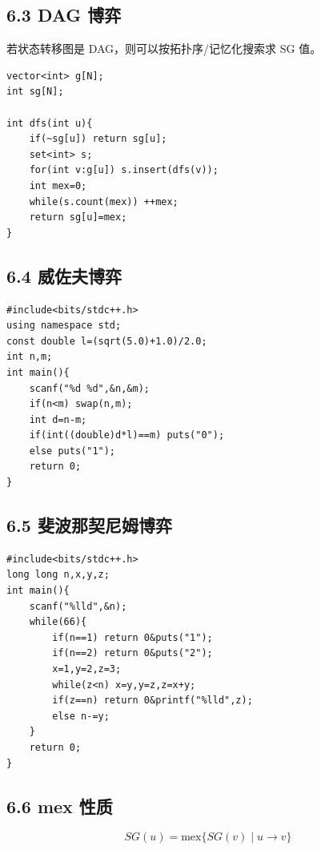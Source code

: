 \documentclass[UTF8,a4paper,11pt]{ctexart}
\begin{document}
\subsection*{6.3 DAG 博弈}

若状态转移图是 DAG，则可以按拓扑序/记忆化搜索求 SG 值。

\begin{Verbatim}[fontsize=\small,frame=single,breaklines=true,breakanywhere=true]
vector<int> g[N];
int sg[N];

int dfs(int u){
    if(~sg[u]) return sg[u];
    set<int> s;
    for(int v:g[u]) s.insert(dfs(v));
    int mex=0;
    while(s.count(mex)) ++mex;
    return sg[u]=mex;
}
\end{Verbatim}

\subsection*{6.4 威佐夫博弈}
\begin{Verbatim}[fontsize=\small,frame=single,breaklines=true,breakanywhere=true]
#include<bits/stdc++.h>
using namespace std;
const double l=(sqrt(5.0)+1.0)/2.0;
int n,m;
int main(){
    scanf("%d %d",&n,&m);
    if(n<m) swap(n,m);
    int d=n-m;
    if(int((double)d*l)==m) puts("0");
    else puts("1");
    return 0;
}
\end{Verbatim}

\subsection*{6.5 斐波那契尼姆博弈}
\begin{Verbatim}[fontsize=\small,frame=single,breaklines=true,breakanywhere=true]
#include<bits/stdc++.h>
long long n,x,y,z;
int main(){
    scanf("%lld",&n);
	while(66){
		if(n==1) return 0&puts("1");
		if(n==2) return 0&puts("2");
		x=1,y=2,z=3;
		while(z<n) x=y,y=z,z=x+y;
		if(z==n) return 0&printf("%lld",z); 
        else n-=y;
	}
	return 0;
}
\end{Verbatim}

\subsection*{6.6 mex 性质}

\[
SG(u)=\mathrm{mex}\{SG(v)\mid u\to v\}
\]
\end{document}
